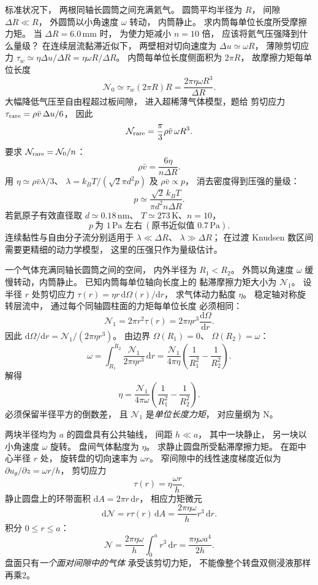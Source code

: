标准状况下，
两根同轴长圆筒之间充满氦气。
圆筒平均半径为 $R$，
间隙 $\Delta R\ll R$，
外圆筒以小角速度 $\omega$ 转动，
内筒静止。
求内筒每单位长度所受摩擦力矩。
当 $\Delta R=6.0\,\mathrm{mm}$ 时，
为使力矩减小 $n=10$ 倍，
应该将氦气压强降到什么量级？
\exsolution
在连续层流黏滞近似下，
两壁相对切向速度为
$\Delta u\simeq\omega R$，
薄隙剪切应力
$\tau_w\simeq\eta\Delta u/\Delta R
=\eta\omega R/\Delta R$。
内筒每单位长度侧面积为 $2\pi R$，
故摩擦力矩每单位长度
\[
\boxed{\mathcal N_0\simeq
\tau_w(2\pi R)R
=\frac{2\pi\eta\omega R^3}{\Delta R}}.
\]
大幅降低气压至自由程超过板间隙，
进入超稀薄气体模型，题给
剪切应力
$\tau_{\rm rare}=\rho\bar v\,\Delta u/6$，
因此
\[
\mathcal N_{\rm rare}
=\frac{\pi}{3}\rho\bar v\,\omega R^3.
\]
要求
$\mathcal N_{\rm rare}=\mathcal N_0/n$：
\[
\rho\bar v=\frac{6\eta}{n\Delta R}.
\]
用
$\eta\simeq\rho\bar v\lambda/3$、
$\lambda=k_BT/(\sqrt2\pi d^2p)$
及 $\rho\bar v\propto p$，
消去密度得到压强的量级：
\[
\boxed{p\simeq\frac{\sqrt2\,k_BT}
{\pi d^2n\Delta R}}.
\]
若氦原子有效直径取
$d\simeq0.18\,\mathrm{nm}$、
$T\simeq273\,\mathrm K$、$n=10$，
\[
\boxed{p\ \text{为 }1\,\mathrm{Pa}\text{ 左右}
\ (\text{原书近似值 }0.7\,\mathrm{Pa})}.
\]
\excheck 连续黏性与自由分子流分别适用于
$\lambda\ll\Delta R$、
$\lambda\gg\Delta R$；
在过渡 Knudsen 数区间需要更精细的动力学模型，
这里的压强只作为量级估计。

一个气体充满同轴长圆筒之间的空间，
内外半径为 $R_1<R_2$。
外筒以角速度 $\omega$ 缓慢转动，内筒静止。
已知内筒每单位轴向长度上的
黏滞摩擦力矩大小为 $\mathcal N_1$。
设半径 $r$ 处剪切应力
$\tau(r)=\eta r\,\mathrm d\Omega(r)/\mathrm dr$，
求气体动力黏度 $\eta$。
\exsolution
稳定轴对称旋转层流中，
通过每个同轴圆柱面的力矩每单位长度
必须相同：
\[
\mathcal N_1=2\pi r^2\tau(r)
=2\pi\eta r^3
\frac{\mathrm d\Omega}{\mathrm dr}.
\]
因此
$\mathrm d\Omega/\mathrm dr=
\mathcal N_1/(2\pi\eta r^3)$。
由边界
$\Omega(R_1)=0$、
$\Omega(R_2)=\omega$：
\[
\omega=\int_{R_1}^{R_2}
\frac{\mathcal N_1}{2\pi\eta r^3}\,\mathrm dr
=\frac{\mathcal N_1}{4\pi\eta}
\left(\frac1{R_1^2}-\frac1{R_2^2}\right).
\]
解得
\[
\boxed{\eta=\frac{\mathcal N_1}{4\pi\omega}
\left(\frac1{R_1^2}-\frac1{R_2^2}\right)}.
\]
\excheck 必须保留半径平方的倒数差，
且 $\mathcal N_1$ 是\emph{单位长度力矩}，
对应量纲为 $\mathrm{N}$。

两块半径均为 $a$ 的圆盘具有公共轴线，
间距 $h\ll a$，
其中一块静止，
另一块以小角速度 $\omega$ 旋转。
盘间气体黏度为 $\eta$。
求静止圆盘所受黏滞摩擦力矩。
\exsolution
在距中心半径 $r$ 处，
旋转盘的切向速率为 $\omega r$。
窄间隙中的线性速度梯度近似为
$\partial u_\theta/\partial z=\omega r/h$，
剪切应力
\[
\tau(r)=\eta\frac{\omega r}{h}.
\]
静止圆盘上的环带面积
$\mathrm dA=2\pi r\,\mathrm dr$，
相应力矩微元
\[
\mathrm d\mathcal N=
r\tau(r)\,\mathrm dA
=\frac{2\pi\eta\omega}{h}r^3\,\mathrm dr.
\]
积分 $0\le r\le a$：
\[
\boxed{\mathcal N=
\frac{2\pi\eta\omega}{h}
\int_0^a r^3\,\mathrm dr
=\frac{\pi\eta\omega a^4}{2h}}.
\]
\excheck 盘面只有\emph{一个面对间隙中的气体}
承受该剪切力矩，
不能像整个转盘双侧浸液那样再乘2。


